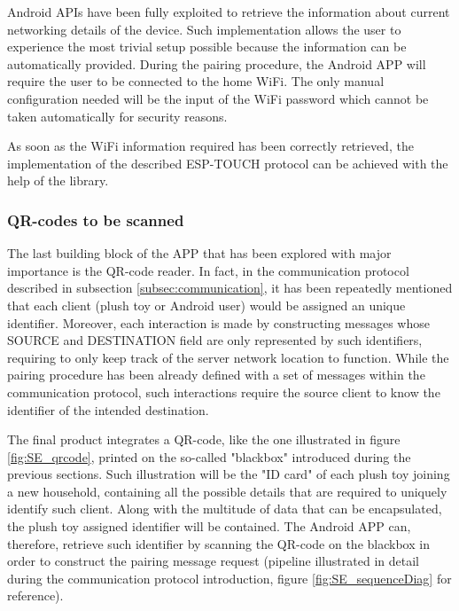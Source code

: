 Android APIs have been fully exploited to retrieve the information about current networking details of the device. Such implementation allows the user to experience the most trivial setup possible because the information can be automatically provided. During the pairing procedure, the Android APP will require the user to be connected to the home WiFi. The only manual configuration needed will be the input of the WiFi password which cannot be taken automatically for security reasons.

\medskip
As soon as the WiFi information required has been correctly retrieved, the implementation of the described ESP-TOUCH protocol can be achieved with the help of the library.

\subsubsection{QR-codes to be scanned}
\label{subsubsec:android-barcode} 

The last building block of the APP that has been explored with major importance is the QR-code reader. In fact, in the communication protocol described in subsection \ref{subsec:communication}, it has been repeatedly mentioned that each client (plush toy or Android user) would be assigned an unique identifier. Moreover, each interaction is made by constructing messages whose SOURCE and DESTINATION field are only represented by such identifiers, requiring to only keep track of the server network location to function. While the pairing procedure has been already defined with a set of messages within the communication protocol, such interactions require the source client to know the identifier of the intended destination.

\medskip
The final product integrates a QR-code, like the one illustrated in figure \ref{fig:SE_qrcode}, printed on the so-called "blackbox" introduced during the previous sections. Such illustration will be the "ID card" of each plush toy joining a new household, containing all the possible details that are required to uniquely identify such client. Along with the multitude of data that can be encapsulated, the plush toy assigned identifier will be contained. The Android APP can, therefore, retrieve such identifier by scanning the QR-code on the blackbox in order to construct the pairing message request (pipeline illustrated in detail during the communication protocol introduction, figure \ref{fig:SE_sequenceDiag} for reference).

